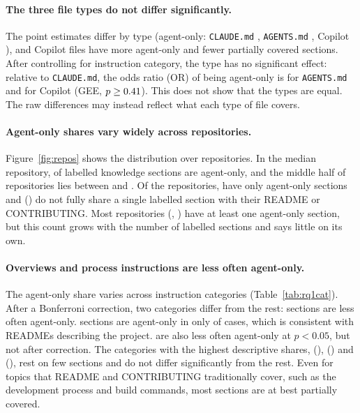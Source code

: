 \documentclass[sigconf,nonacm]{acmart}
\begin{document}
\paragraph{The three file types do not differ significantly.} The point estimates differ by type
(agent-only: \texttt{CLAUDE.md} \agentOnlyClaude, \texttt{AGENTS.md} \agentOnlyAgents, Copilot
\agentOnlyCopilot), and Copilot files have more agent-only and fewer partially covered sections.
After controlling for instruction category, the type has no significant effect: relative to
\texttt{CLAUDE.md}, the odds ratio (OR) of being agent-only is \geeOrAgents{} for \texttt{AGENTS.md}
and \geeOrCopilot{} for Copilot (GEE, $p \ge 0.41$). This does not show that the types are
equal. The raw differences may instead reflect what each type of file covers.

\paragraph{Agent-only shares vary widely across repositories.} Figure~\ref{fig:repos} shows the
distribution over repositories. In the median repository, \repoAgentOnlyMedian{} of labelled
knowledge sections are agent-only, and the middle half of repositories lies between \repoAgentOnlyQOne{} and
\repoAgentOnlyQThree. Of the \nRepoKnowledge{} repositories, \repoAllAgentOnly{} have only agent-only
sections and \repoNoShared{} (\repoNoSharedShare) do not fully share a single labelled section with
their README or CONTRIBUTING. Most repositories (\repoAnyAgentOnly, \repoAnyAgentOnlyShare) have at
least one agent-only section, but this count grows with the number of labelled sections and says
little on its own.



\paragraph{Overviews and process instructions are less often agent-only.} The agent-only share
varies across instruction categories (Table~\ref{tab:rq1cat}). After a Bonferroni correction, two
categories differ from the rest: \geeBonferroniCatsOR{} sections are less often agent-only.
\catLow{} sections are agent-only in only \catLowShare{} of cases, which is consistent with READMEs
describing the project. \geeUnadjustedOnlyCats{} are also less often agent-only at $p < 0.05$, but
not after correction. The categories with the highest descriptive shares, \catHighOne{}
(\catHighOneShare), \catHighTwo{} (\catHighTwoShare) and \catHighThree{} (\catHighThreeShare), rest
on few sections and do not differ significantly from the rest. Even for topics that README and
CONTRIBUTING traditionally cover, such as the development process and build commands, most sections
are at best partially covered.
\end{document}
